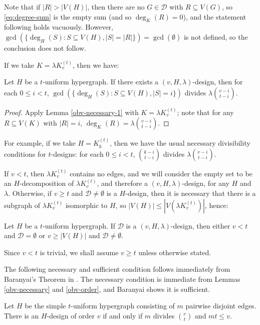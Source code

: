 Note that if $|R| > |V(H)|$, then there are no $G \in \mathcal{D}$ with $R \subseteq V(G)$,
so \eqref{eq:degree-sum} is the empty sum (and so $\deg_K(R) = 0$), and the statement following holds vacuously.
However, $\gcd(\{\deg_H(S) : S \subseteq V(H), |S| = |R|\}) = \gcd(\emptyset)$ is not defined,
so the conclusion does not follow.

If we take $K = \lambda K_v^{(t)}$, then we have:

\begin{lemma} \label{obv-necessary}
Let $H$ be a $t$-uniform hypergraph.
If there exists a $(v, H, \lambda)$-design, then for each $0 \leq i < t$,
  $\gcd(\{ \deg_H(S) : S \subseteq V(H), |S| = i \})$ divides $\lambda {v-i \choose t-i}$.
\end{lemma}

\begin{proof}
Apply Lemma \ref{obv-necessary-1} with $K = \lambda K_v^{(t)}$;
  note that for any $R \subseteq V(K)$ with $|R| = i$, $\deg_K(R) = \lambda {v-i \choose t-i}$.
\end{proof}

For example, if we take $H = K_k^{(t)}$, then we have the usual necessary divisibility conditions for $t$-designs: for each $0 \leq i < t$, ${k-i \choose t-i}$ divides $\lambda {v-i \choose t-i}$.

If $v < t$, then $\lambda K_v^{(t)}$ contains no edges, and we will consider the empty set to be an $H$-decomposition of $\lambda K_v^{(t)}$, and therefore a $(v, H, \lambda)$-design, for any $H$ and $\lambda$. Otherwise, if $v \geq t$ and $\mathcal{D} \neq \emptyset$ is a $H$-design, then it is necessary that there is a subgraph of $\lambda K_v^{(t)}$ isomorphic to $H$, so $|V(H)| \leq |V(\lambda K_v^{(t)})|$, hence:

\begin{lemma} \label{obv-order}
Let $H$ be a $t$-uniform hypergraph. If $\mathcal{D}$ is a $(v, H, \lambda)$-design, then either $v < t$ and $\mathcal{D} = \emptyset$ or $v \geq |V(H)|$ and $\mathcal{D} \neq \emptyset$.
\end{lemma}

Since $v < t$ is trivial, we shall assume $v \geq t$ unless otherwise stated.

The following necessary and sufficient condition follows immediately from Baranyai's Theorem in \cite{baran}. The necessary condition is immediate from Lemmas \ref{obv-necessary} and \ref{obv-order}, and Baranyai shows it is sufficient.

\begin{theorem} \label{baranyai}
Let $H$ be the simple $t$-uniform hypergraph consisting of $m$ pairwise disjoint edges. There is an $H$-design of order $v$ if and only if $m$ divides ${v \choose t}$ and $mt \leq v$.
\end{theorem}
